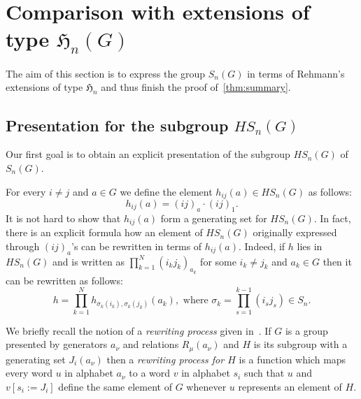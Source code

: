 \documentclass[oneside, 10pt]{amsart}
\theoremstyle{plain}
\numberwithin{equation}{section}
\numberwithin{lemma}{section}
\theoremstyle{remark}
\theoremstyle{definition}
\begin{document}
\section{Comparison with extensions of type \texorpdfstring{$\mathfrak{H}_n(G)$}{Hn(G)}} \label{sec:Hnextensions}
The aim of this section is to express the group $S_n(G)$ in terms of Rehmann's extensions of
 type $\mathfrak{H}_n$ and thus finish the proof of~\cref{thm:summary}. 

\subsection{Presentation for the subgroup $HS_n(G)$}
Our first goal is to obtain an explicit presentation of the subgroup $HS_n(G)$ of $S_n(G)$.

For every $i\neq j$ and $a\in G$ we define the element $h_{ij}(a) \in HS_n(G)$ as follows:
\begin{equation} \label{eq:h-def} 
h_{ij}(a) = (ij)_{a} \cdot (ij)_1. 
\end{equation}
It is not hard to show that $h_{ij}(a)$ form a generating set for $HS_n(G)$.
In fact, there is an explicit formula how an element of $HS_n(G)$ originally expressed through $(ij)_{a}$'s can be rewritten in terms of $h_{ij}(a)$.
Indeed, if $h$ lies in $HS_n(G)$ and is written as $\prod_{k=1}^N(i_k j_k)_{a_k}$ for some $i_k\neq j_k$ and $a_k\in G$ then it can be rewritten as follows:
\begin{equation} \label{eq:rp} \tag{$\tau$}
 h = \prod_{k=1}^N h_{\sigma_k(i_k), \sigma_k(j_k)}(a_k),\text{ where } \sigma_k=\prod_{s=1}^{k-1} (i_s j_s) \in S_n. \end{equation}

We briefly recall the notion of a {\it rewriting process} given in~\cite[\S~2.3]{MKS76}.
If $G$ is a group presented by generators $a_\nu$ and relations $R_{\mu}(a_{\nu})$ and $H$ is its subgroup with a generating set $J_i(a_\nu)$ then
 a {\it rewriting process for $H$} is a function which maps every word $u$ in alphabet $a_\nu$ to a word $v$ in alphabet $s_i$ such that
 $u$ and $v[s_i:=J_i]$ define the same element of $G$ whenever $u$ represents an element of $H$.
\end{document}
